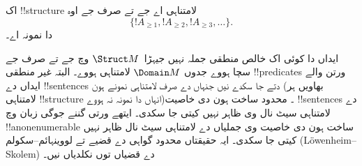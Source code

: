 \documentclass[../../../include/open-logic-section]{subfiles}
\begin{document}
\begin{prop}
اک !!{structure} لامتناہی اے جے تے صرف جے اوہ
\[
\{!A_{\ge 1}, !A_{\ge 2}, !A_{\ge 3}, \dots \}.
\]
دا نمونہ اے۔
\end{prop}

ایداں دا کوئی اک خالص منطقی جملہ نہیں جیہڑا~$\Struct
M$ وچ جے تے صرف جے سچا ہووے جدوں $\Domain M$
لامتناہی ہووے۔ البتہ غیر منطقی !!{predicate}s ورتن
والے ایداں دے !!{sentence}s دتے جا سکدے نیں جنہاں
دے صرف لامتناہی نمونے ہون (بھاویں ہر لامتناہی
!!{structure} انہاں دا نمونہ نہ ہووے)۔ محدود ساخت
ہون دی خاصیت !!{sentence}s دے لامتناہی سیٹ نال وی ظاہر
نہیں کیتی جا سکدی۔
ایتھے ورتی گننے جوگی زبان وچ !!a{nonenumerable} ساخت ہون دی
خاصیت وی جملیاں دے لامتناہی سیٹ نال ظاہر
نہیں کیتی جا سکدی۔ ایہ حقیقتاں محدود گواہی دے
قضیے تے لووینہائم--سکولم (L\"owenheim--Skolem)
دے قضیاں توں نکلدیاں نیں۔
\end{document}
